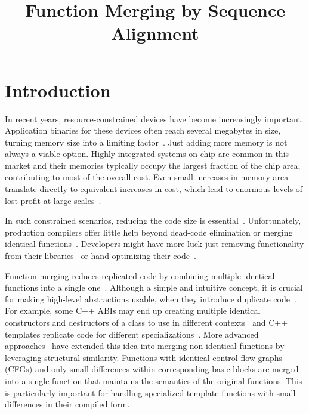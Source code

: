 \documentclass[10pt,twocolumn,nocopyrightspace]{sigplanconf}
\title{Function Merging by Sequence Alignment}
\begin{document}
\maketitle

\section{Introduction}
\label{sec:introduction}

In recent years, resource-constrained devices have become increasingly
important. Application binaries for these devices often reach several megabytes
in size, turning memory size into a limiting factor~\cite{plaza18}. Just adding more
memory is not always a viable option. Highly integrated systems-on-chip are
common in this market and their memories typically occupy the largest fraction
of the chip area, contributing to most of the overall cost. Even small
increases in memory area translate directly to equivalent increases in cost,
which lead to enormous levels of lost profit at large scales~\cite{edler10}.

In such constrained scenarios, reducing the code size is essential~\cite{sehgal12,keoh14,auler17}.
Unfortunately, production compilers offer little help beyond dead-code
elimination or merging identical functions~\cite{tallam10,kwan12,livska14}.
Developers might have more luck just removing functionality from their
libraries~\cite{keoh14} or hand-optimizing their code~\cite{weaver09}.


Function merging reduces replicated code by combining multiple identical
functions into a single one~\cite{llvm-fm,livska14}. 
Although a simple and intuitive concept, it is crucial for making high-level
abstractions usable, when they introduce duplicate code~\cite{tallam10,kwan12}.
For example, some C++ ABIs may end up creating multiple identical constructors
and destructors of a class to use in different contexts~\cite{kwan12} and C++
templates replicate code for different specializations~\cite{tallam10,livska14}.
More advanced approaches~\cite{edler14} have extended this idea into
merging non-identical functions by leveraging structural similarity. Functions
with identical control-flow graphs (CFGs) and only small differences within
corresponding basic blocks are merged into a single function that maintains
the semantics of the original functions. This is particularly important for
handling specialized template functions with small differences in their
compiled form.
\end{document}
